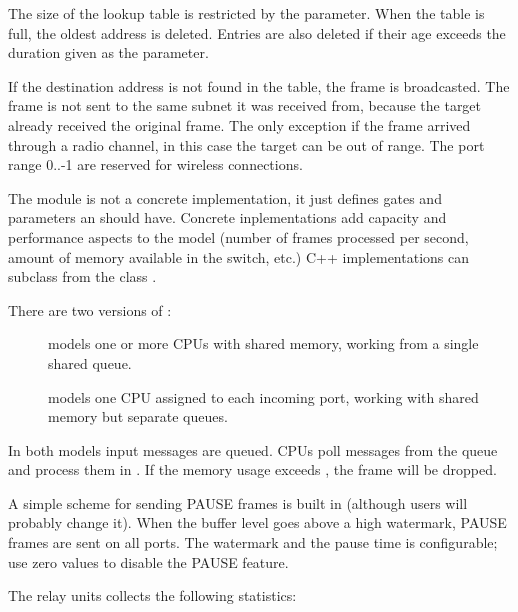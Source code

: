 The size of the lookup table is restricted by the  parameter.
When the table is full, the oldest address is deleted. Entries are also deleted
if their age exceeds the duration given as the  parameter.

If the destination address is not found in the table, the frame is broadcasted.
The frame is not sent to the same subnet it was received from, because the
target already received the original frame. The only exception if the frame
arrived through a radio channel, in this case the target can be out of range.
The port range 0..-1 are reserved for wireless connections.

The  module is not a concrete implementation,
it just defines gates and parameters an  should have.
Concrete inplementations add
capacity and performance aspects to the model (number of frames processed
per second, amount of memory available in the switch, etc.)
C++ implementations can subclass from the class .

There are two versions of :

\begin{description}
  \item[] models one or more CPUs with shared memory,
    working from a single shared queue.
  \item[] models one CPU assigned to each incoming port,
    working with shared memory but separate queues.
\end{description}

In both models input messages are queued. CPUs poll messages from the queue
and process them in . If the memory usage exceeds
, the frame will be dropped.

A simple scheme for sending PAUSE frames is built in (although
users will probably change it). When the buffer level goes
above a high watermark, PAUSE frames are sent on all ports.
The watermark and the pause time is configurable; use zero
values to disable the PAUSE feature.


The relay units collects the following statistics:

